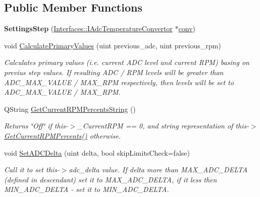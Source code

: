 \subsection*{Public Member Functions}
\begin{DoxyCompactItemize}
\item 
\mbox{\label{class_settings_step_a650844d8164741ba04f153d7d6be1261}} 
{\bfseries Settings\+Step} (\hyperlink{class_interfaces_1_1_i_adc_temperature_convertor}{Interfaces\+::\+I\+Adc\+Temperature\+Convertor} $\ast$\hyperlink{class_interfaces_1_1_i_settings_step_a5db60ca3f2c1b4e7059910e2d86656b9}{conv})
\item 
void \hyperlink{class_settings_step_ac6f79a139ab25cc50ed105f64fc9652f}{Calculate\+Primary\+Values} (uint previous\+\_\+adc, uint previous\+\_\+rpm)
\begin{DoxyCompactList}\small\item\em Calculates primary values (i.\+e. current A\+DC level and current R\+PM) basing on previus step values. If resulting A\+DC / R\+PM levels will be greater than A\+D\+C\+\_\+\+M\+A\+X\+\_\+\+V\+A\+L\+UE / M\+A\+X\+\_\+\+R\+PM respectively, then levels will be set to A\+D\+C\+\_\+\+M\+A\+X\+\_\+\+V\+A\+L\+UE / M\+A\+X\+\_\+\+R\+PM. \end{DoxyCompactList}\item 
Q\+String \hyperlink{class_settings_step_a21e452401e180d6e114561a8b05ab1ae}{Get\+Current\+R\+P\+M\+Percents\+String} ()
\begin{DoxyCompactList}\small\item\em Returns \char`\"{}\+Off\char`\"{} if this-\/$>$\+\_\+\+Current\+R\+PM == 0, and string representation of this-\/$>$\hyperlink{class_settings_step_a35bea9115637a0c848e8f827f2353c11}{Get\+Current\+R\+P\+M\+Percents()} otherwise. \end{DoxyCompactList}\item 
void \hyperlink{class_settings_step_a8124c87ae0b1d9fb3b623144d0e492db}{Set\+A\+D\+C\+Delta} (uint delta, bool skip\+Limits\+Check=false)
\begin{DoxyCompactList}\small\item\em Call it to set this-\/$>$adc\+\_\+delta value. If delta more than M\+A\+X\+\_\+\+A\+D\+C\+\_\+\+D\+E\+L\+TA (defined in descendant) set it to M\+A\+X\+\_\+\+A\+D\+C\+\_\+\+D\+E\+L\+TA, if it less then M\+I\+N\+\_\+\+A\+D\+C\+\_\+\+D\+E\+L\+TA -\/ set it to M\+I\+N\+\_\+\+A\+D\+C\+\_\+\+D\+E\+L\+TA. \end{DoxyCompactList}\item 

\end{DoxyCompactItemize}
